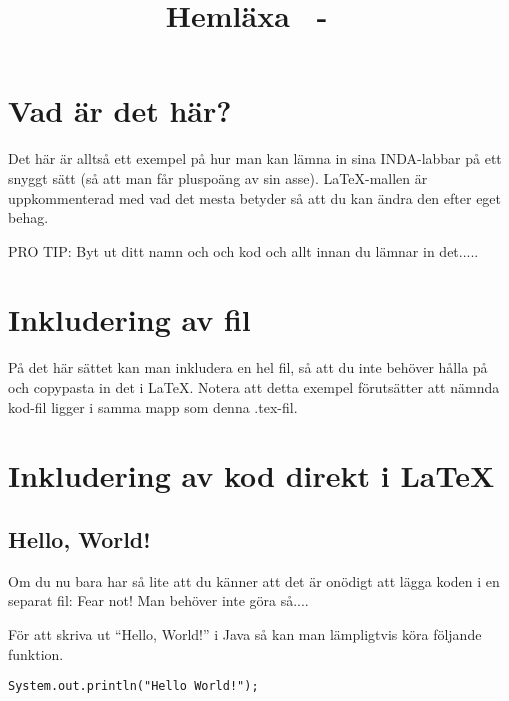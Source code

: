 \documentclass[a4paper,10pt,twoside]{article}
\title{Hemläxa \homeworknumber\ - \course\ \coursename}
\date{\thedate}
\author{\theauthor}
\begin{document}
\section{Vad är det här?}

Det här är alltså ett exempel på hur man kan lämna in sina INDA-labbar på ett snyggt sätt (så att man får pluspoäng av sin asse). LaTeX-mallen är uppkommenterad med vad det mesta betyder så att du kan ändra den efter eget behag. 

PRO TIP: Byt ut ditt namn och och kod och allt innan du lämnar in det..... 

\section{Inkludering av fil} %

På det här sättet kan man inkludera en hel fil, så att du inte behöver hålla på och copypasta in det i LaTeX. Notera att detta exempel förutsätter att nämnda kod-fil ligger i samma mapp som denna .tex-fil. 

\label{sec:Foo_java} %

\section{Inkludering av kod direkt i LaTeX}
\subsection{Hello, World!}

Om du nu bara har så lite att du känner att det är onödigt att lägga koden i en separat fil: Fear not! Man behöver inte göra så....

För att skriva ut ``Hello, World!'' i Java så kan man lämpligtvis köra följande funktion.

\begin{lstlisting}
System.out.println("Hello World!");
\end{lstlisting}
\end{document}
